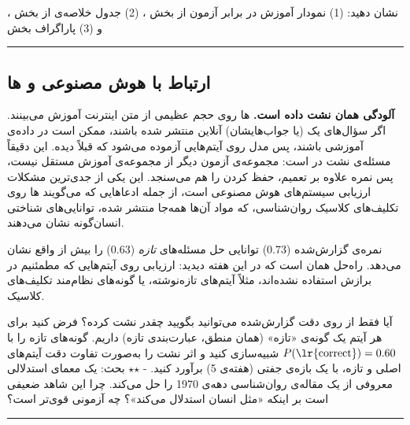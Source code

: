\subsubsection{\texorpdfstring{}{lab check-off}}

نشان دهید: (1) نمودار آموزش در برابر آزمون از بخش ، (2) جدول
خلاصه‌ی  از بخش ، و (3) پاراگراف بخش 

\begin{center}\rule{0.5\linewidth}{0.5pt}\end{center}

\subsection{\texorpdfstring{ارتباط با هوش مصنوعی و
ها}{ارتباط با هوش مصنوعی و LLMها}}

\textbf{آلودگی  همان نشت داده است.}
ها روی حجم عظیمی از متن اینترنت آموزش می‌بینند. اگر سؤال‌های یک
 (یا جواب‌هایشان) آنلاین منتشر شده باشند، ممکن است در داده‌ی
آموزشی باشند، پس مدل روی آیتم‌هایی آزموده می‌شود که قبلاً دیده. این دقیقاً
مسئله‌ی نشت در  است: مجموعه‌ی آزمون دیگر از مجموعه‌ی
آموزش مستقل نیست، پس نمره علاوه بر تعمیم، حفظ کردن را هم می‌سنجد. این یکی
از جدی‌ترین مشکلات ارزیابی سیستم‌های هوش مصنوعی است، از جمله ادعاهایی که
می‌گویند ها روی تکلیف‌های کلاسیک روان‌شناسی، که مواد آن‌ها همه‌جا
منتشر شده، توانایی‌های شناختی انسان‌گونه نشان می‌دهند.

نمره‌ی گزارش‌شده (0.73) توانایی حل مسئله‌های \emph{تازه} (0.63) را بیش از
واقع نشان می‌دهد. راه‌حل همان است که در  این هفته دیدید: ارزیابی
روی آیتم‌هایی که مطمئنیم در برازش استفاده نشده‌اند، مثلاً آیتم‌های
تازه‌نوشته، یا گونه‌های نظام‌مند تکلیف‌های کلاسیک.

آیا فقط از روی دقت گزارش‌شده می‌توانید بگویید چقدر نشت کرده؟ فرض کنید برای
هر آیتم یک گونه‌ی «تازه» (همان منطق، عبارت‌بندی تازه) داریم. گونه‌های تازه
را با \(P(\text{\lr{correct}}) = 0.60\) شبیه‌سازی کنید و اثر نشت را به‌صورت
تفاوت دقت آیتم‌های اصلی و تازه، با یک بازه‌ی  جفتی (هفته‌ی 5)
برآورد کنید. - \ensuremath{\star}\ensuremath{\star} بحث: یک  معمای استدلالی معروفی از یک مقاله‌ی
روان‌شناسی دهه‌ی 1970 را حل می‌کند. چرا این شاهد ضعیفی است بر اینکه «مثل
انسان استدلال می‌کند»؟ چه آزمونی قوی‌تر است؟

\begin{center}\rule{0.5\linewidth}{0.5pt}\end{center}

